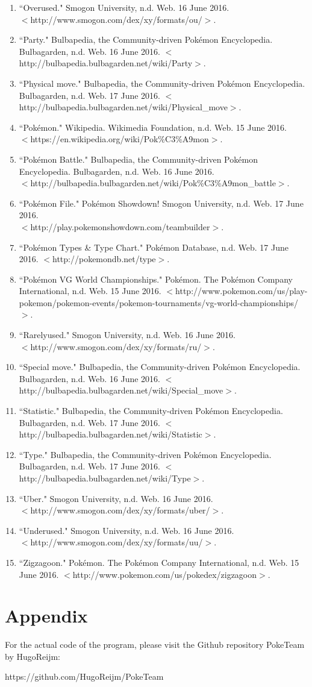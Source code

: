 \documentclass{article}
\begin{document}
\begin{enumerate}
	\item ``Overused." Smogon University, n.d. Web. 16 June 2016. \\$<$http://www.smogon.com/dex/xy/formats/ou/$>$.
	\item ``Party." Bulbapedia, the Community-driven Pokémon Encyclopedia. Bulbagarden, n.d. Web. 16 June 2016. $<$http://bulbapedia.bulbagarden.net/wiki/Party$>$.
	\item ``Physical move." Bulbapedia, the Community-driven Pokémon Encyclopedia. Bulbagarden, n.d. Web. 17 June 2016. $<$http://bulbapedia.bulbagarden.net/wiki/Physical\_move$>$.
	\item ``Pokémon." Wikipedia. Wikimedia Foundation, n.d. Web. 15 June 2016. \\$<$https://en.wikipedia.org/wiki/Pok\%C3\%A9mon$>$. 
	\item ``Pokémon Battle." Bulbapedia, the Community-driven Pokémon Encyclopedia. Bulbagarden, n.d. Web. 16 June 2016. \\$<$http://bulbapedia.bulbagarden.net/wiki/Pok\%C3\%A9mon\_battle$>$.
	\item ``Pok\'emon File." Pok\'emon Showdown! Smogon University, n.d. Web. 17 June 2016. \\$<$http://play.pokemonshowdown.com/teambuilder$>$.
	\item ``Pokémon Types \& Type Chart." Pokémon Database, n.d. Web. 17 June 2016. $<$http://pokemondb.net/type$>$. 
	\item ``Pokémon VG World Championships." Pok\'emon. The Pok\'emon Company International, n.d. Web. 15 June 2016. $<$http://www.pokemon.com/us/play-pokemon/pokemon-events/pokemon-tournaments/vg-world-championships/$>$.
	\item ``Rarelyused." Smogon University, n.d. Web. 16 June 2016. \\$<$http://www.smogon.com/dex/xy/formats/ru/$>$.
	\item ``Special move." Bulbapedia, the Community-driven Pokémon Encyclopedia. Bulbagarden, n.d. Web. 16 June 2016. $<$http://bulbapedia.bulbagarden.net/wiki/Special\_move$>$.
	\item ``Statistic." Bulbapedia, the Community-driven Pokémon Encyclopedia. Bulbagarden, n.d. Web. 17 June 2016. $<$http://bulbapedia.bulbagarden.net/wiki/Statistic$>$.
	\item ``Type." Bulbapedia, the Community-driven Pokémon Encyclopedia. Bulbagarden, n.d. Web. 17 June 2016. $<$http://bulbapedia.bulbagarden.net/wiki/Type$>$.
	\item ``Uber." Smogon University, n.d. Web. 16 June 2016. \\$<$http://www.smogon.com/dex/xy/formats/uber/$>$.
	\item ``Underused." Smogon University, n.d. Web. 16 June 2016. \\$<$http://www.smogon.com/dex/xy/formats/uu/$>$.
	\item ``Zigzagoon." Pok\'emon. The Pok\'emon Company International, n.d. Web. 15 June 2016. $<$http://www.pokemon.com/us/pokedex/zigzagoon$>$.
\end{enumerate}
\section{Appendix}
For the actual code of the program, please visit the Github repository PokeTeam by HugoReijm:\\
\begin{center}
	https://github.com/HugoReijm/PokeTeam
\end{center}
\end{document}
